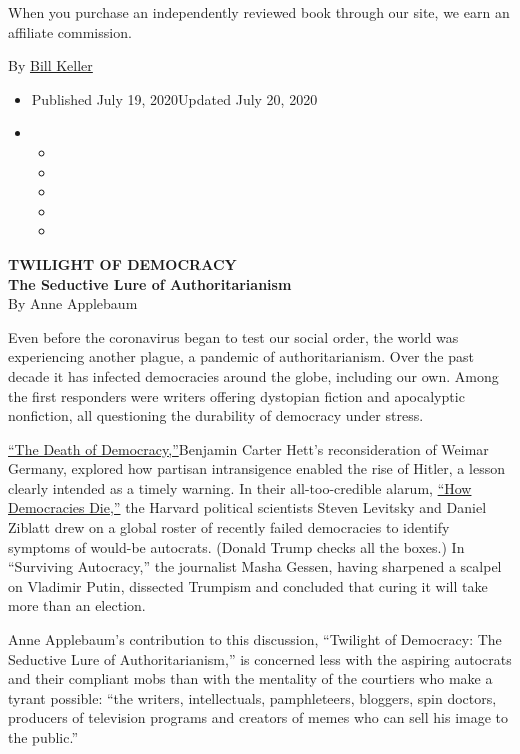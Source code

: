 When you purchase an independently reviewed book through our site, we
earn an affiliate commission.

By
\href{https://topics.nytimes.com/top/reference/timestopics/people/k/bill_keller/index.html}{Bill
Keller}

\begin{itemize}
\item
  Published July 19, 2020Updated July 20, 2020
\item
  \begin{itemize}
  \item
  \item
  \item
  \item
  \item
  \end{itemize}
\end{itemize}

\textbf{TWILIGHT OF DEMOCRACY}\\
\textbf{The Seductive Lure of Authoritarianism}\\
By Anne Applebaum

Even before the coronavirus began to test our social order, the world
was experiencing another plague, a pandemic of authoritarianism. Over
the past decade it has infected democracies around the globe, including
our own. Among the first responders were writers offering dystopian
fiction and apocalyptic nonfiction, all questioning the durability of
democracy under stress.

\href{https://www.nytimes.com/2018/06/14/books/review/benjamin-carter-hett-death-of-democracy.html}{``The
Death of Democracy,''}Benjamin Carter Hett's reconsideration of Weimar
Germany, explored how partisan intransigence enabled the rise of Hitler,
a lesson clearly intended as a timely warning. In their all-too-credible
alarum,
\href{https://www.nytimes.com/2018/01/10/books/review-trumpocracy-david-frum-how-democracies-die-steven-levitsky-daniel-ziblatt.html}{``How
Democracies Die,''} the Harvard political scientists Steven Levitsky and
Daniel Ziblatt drew on a global roster of recently failed democracies to
identify symptoms of would-be autocrats. (Donald Trump checks all the
boxes.) In ``Surviving Autocracy,'' the journalist Masha Gessen, having
sharpened a scalpel on Vladimir Putin, dissected Trumpism and concluded
that curing it will take more than an election.

Anne Applebaum's contribution to this discussion, ``Twilight of
Democracy: The Seductive Lure of Authoritarianism,'' is concerned less
with the aspiring autocrats and their compliant mobs than with the
mentality of the courtiers who make a tyrant possible: ``the writers,
intellectuals, pamphleteers, bloggers, spin doctors, producers of
television programs and creators of memes who can sell his image to the
public.''

